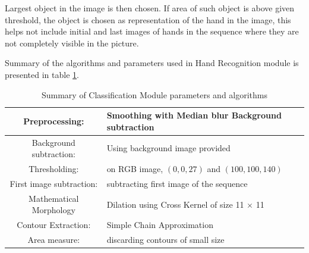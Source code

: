 Largest object in the image is then chosen. If area of such object is above given threshold, the object is chosen as representation of the hand in the image, this helps not include initial and last images of hands in the sequence where they are not completely visible in the picture.

Summary of the algorithms and parameters used in Hand Recognition module is presented in table \ref{tbl:recognition}.
\begin{table}
\begin{tabular}{|c|l|}
\hline 
Preprocessing: & Smoothing with Median blur  Background subtraction\\ 
\hline 
Background subtraction: & Using background image provided\\ 
\hline
Thresholding: & on RGB image, $(0, 0, 27)$ and $(100, 100, 140)$\\ 
\hline
First image subtraction: & subtracting first image of the sequence\\ 
\hline
Mathematical Morphology & Dilation using Cross Kernel of size 11 $\times$ 11 \\ 
\hline 
Contour Extraction: & Simple Chain Approximation \\ 
\hline 
Area measure: & discarding contours of small size \\
\hline 
\end{tabular} 
\caption{Summary of Classification Module parameters and algorithms}
\label{tbl:recognition}
\end{table}